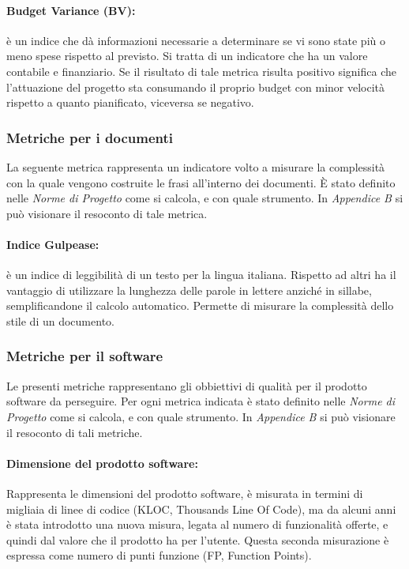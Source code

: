 \paragraph{Budget Variance (BV):} è un indice che dà informazioni necessarie a determinare se vi sono state più o meno spese rispetto al previsto. Si tratta di un indicatore che ha un valore contabile e finanziario. Se il risultato di tale metrica risulta positivo significa che l'attuazione del progetto sta consumando il proprio budget con minor velocità rispetto a quanto pianificato, viceversa se negativo.

\subsubsection{Metriche per i documenti}
La seguente metrica rappresenta un indicatore volto a misurare la complessità con la quale vengono costruite le frasi all'interno dei documenti.
È stato definito nelle \emph{Norme di Progetto \VersioneNP{}} come si calcola, e con quale strumento. In \emph{Appendice B} si può visionare il resoconto di tale metrica.

\paragraph{Indice Gulpease:} è un indice di leggibilità di un testo per la lingua italiana.
Rispetto ad altri ha il vantaggio di utilizzare la lunghezza delle parole in lettere anziché in sillabe, semplificandone il calcolo automatico. Permette di misurare la complessità dello stile di un documento.

\subsubsection{Metriche per il software}
Le presenti metriche rappresentano gli obbiettivi di qualità per il prodotto software da perseguire.
Per ogni metrica indicata è stato definito nelle \emph{Norme di Progetto \VersioneNP{}} come si calcola, e con quale strumento. In \emph{Appendice B} si può visionare il resoconto di tali metriche.

\paragraph{Dimensione del prodotto software:} Rappresenta le dimensioni del prodotto software, è misurata in termini di migliaia di linee di codice (KLOC, Thousands Line Of Code),
ma da alcuni anni è stata introdotto una nuova misura, legata al numero di funzionalità offerte, e quindi dal valore che il prodotto ha per l’utente.
Questa seconda misurazione è espressa come numero di punti funzione (FP, Function Points).

